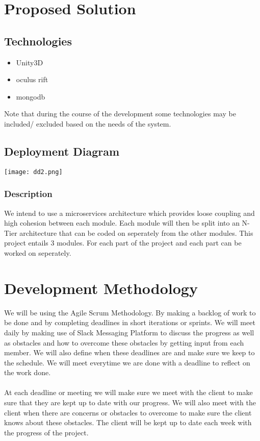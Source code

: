 \documentclass{article}
\begin{document}
\section{Proposed Solution}

\subsection{Technologies}
\begin{itemize}
	\item Unity3D
	\item oculus rift
	\item mongodb
\end{itemize}
Note that during the course of the development some technologies may be included/ excluded based on the needs of the system.
\subsection{Deployment Diagram}
\texttt{[image: dd2.png]} \\

\subsubsection{Description}
We intend to use a microservices architecture which provides loose coupling and high cohesion between each module. Each module will then be split into an N-Tier architecture that can be coded on seperately from the other modules. This project entails 3 modules. For each part of the project and each part can be worked on seperately.
\section{Development Methodology}
We will be using the Agile Scrum Methodology. By making a backlog of work to be done and by completing deadlines in short iterations or sprints. We will meet daily by making use of  Slack Messaging Platform to discuss the progress as well as obstacles and how to overcome these obstacles by getting input from each member. We will also define when these deadlines are and make sure we keep to the schedule. We will meet everytime we are done with a deadline to reflect on the work done. \\ \\
At each deadline or meeting we will make sure we meet with the client to make sure that they are kept up to date with our progress. We will also meet with the client when there are concerns or obstacles to overcome to make sure the client knows  about these obstacles. The client will be kept up to date each week with the progress of the project.
\end{document}
